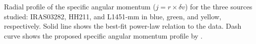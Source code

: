 Radial profile of the specific angular momentum ($j=r \times \delta v$) for the three sources studied: 
IRAS03282, HH211, and L1451-mm in blue, green, and yellow, respectively. 
Solid line shows the best-fit power-law relation to the data.
Dash curve shows the proposed specific angular momentum profile by \cite{Belloche_2013}. 
